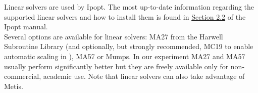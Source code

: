 Linear solvers are used by Ipopt. The most up-to-date information regarding the supported linear solvers and how to install them is found in \href{http://www.coin-or.org/Ipopt/documentation/node13.html}{Section 2.2} of the Ipopt manual.\\

Several options are available for linear solvers: MA27 from the Harwell Subroutine Library (and optionally, but strongly recommended, MC19 to enable automatic scaling in \Ipopt), MA57 or Mumps.
In our experiment MA27 and MA57 usually perform significantly better but they are freely 
available only for non-commercial, academic use. Note that linear solvers can also take advantage of Metis.
